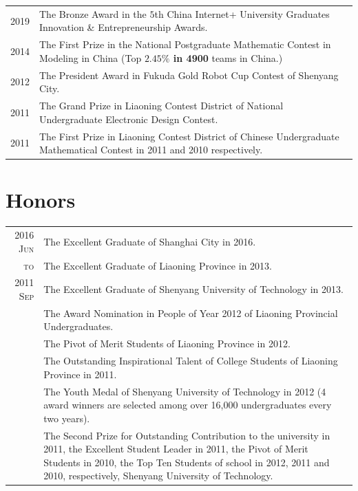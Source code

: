 \documentclass[a4paper,10pt]{article}
\begin{document}
\begin{longtable}[H]{r|p{13.5cm}}
  \hspace{20pt} \textsc{2019} & The Bronze Award in the $5$th China Internet+ University Graduates Innovation \& Entrepreneurship Awards. \\
  \textsc{2014} & The First Prize in the National Postgraduate Mathematic Contest in Modeling in China (Top \textbf{$\mathbf{2.45\%}$ in 4900} teams in China.)\\
  \textsc{2012} & The President Award in Fukuda Gold Robot Cup Contest of Shenyang City. \\
  \textsc{2011} & The Grand Prize in Liaoning Contest District of National Undergraduate Electronic Design Contest. \\
  \textsc{2011} & The First Prize in Liaoning Contest District of Chinese Undergraduate Mathematical Contest in 2011 and
                  2010 respectively. \\
\end{longtable}

\section{Honors}
\begin{longtable}[H]{r|p{13.5cm}}
  \textsc{2016 Jun} & The Excellent Graduate of Shanghai City in 2016. \\
  \textsc{to}& The Excellent Graduate of Liaoning Province in 2013. \\
  \textsc{2011 Sep} & The Excellent Graduate of Shenyang University of Technology in 2013. \\
                    & The Award Nomination in People of Year 2012 of Liaoning Provincial Undergraduates. \\
                    & The Pivot of Merit Students of Liaoning Province in 2012. \\
                    & The Outstanding Inspirational Talent of College Students of Liaoning Province in 2011. \\
                    & The Youth Medal of Shenyang University of Technology in 2012 (4 award winners are selected among over 16,000 undergraduates every two years). \\
                    & The {Second Prize for Outstanding Contribution} to the university in 2011, the {Excellent Student Leader} in 2011, the {Pivot of Merit Students} in 2010, the {Top Ten Students} of school in 2012, 2011 and 2010, respectively, Shenyang University of Technology.
\end{longtable}
\end{document}
